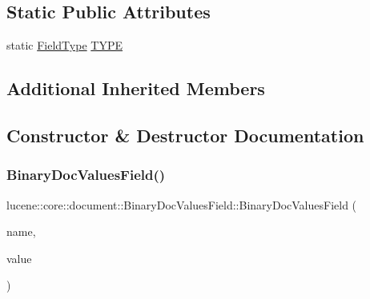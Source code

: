 \subsection*{Static Public Attributes}
\begin{DoxyCompactItemize}
\item 
static \mbox{\hyperlink{classlucene_1_1core_1_1document_1_1FieldType}{Field\+Type}} \mbox{\hyperlink{classlucene_1_1core_1_1document_1_1BinaryDocValuesField_a0602bedeb853cd58ec5185a239503d1a}{T\+Y\+PE}}
\end{DoxyCompactItemize}
\subsection*{Additional Inherited Members}


\subsection{Constructor \& Destructor Documentation}
\mbox{\label{classlucene_1_1core_1_1document_1_1BinaryDocValuesField_ab25498388b61dec98a2a1bf9b4f73e92}} 
\subsubsection{\texorpdfstring{Binary\+Doc\+Values\+Field()}{BinaryDocValuesField()}\hspace{0.1cm}{\footnotesize\ttfamily [1/2]}}
{\footnotesize\ttfamily lucene\+::core\+::document\+::\+Binary\+Doc\+Values\+Field\+::\+Binary\+Doc\+Values\+Field (\begin{DoxyParamCaption}\item[{\mbox{\hyperlink{ZlibCrc32_8h_a2c212835823e3c54a8ab6d95c652660e}{const}} std\+::string \&}]{name,  }\item[{\mbox{\hyperlink{ZlibCrc32_8h_a2c212835823e3c54a8ab6d95c652660e}{const}} \mbox{\hyperlink{classlucene_1_1core_1_1util_1_1BytesRef}{lucene\+::core\+::util\+::\+Bytes\+Ref}} \&}]{value }\end{DoxyParamCaption})\hspace{0.3cm}{\ttfamily [inline]}}

